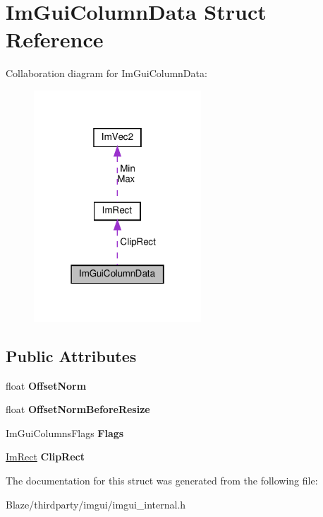 \hypertarget{structImGuiColumnData}{}\section{Im\+Gui\+Column\+Data Struct Reference}
\label{structImGuiColumnData}


Collaboration diagram for Im\+Gui\+Column\+Data\+:\nopagebreak
\begin{figure}[H]
\begin{center}
\leavevmode
\includegraphics[width=178pt]{structImGuiColumnData__coll__graph}
\end{center}
\end{figure}
\subsection*{Public Attributes}
\begin{DoxyCompactItemize}
\item 
\mbox{\label{structImGuiColumnData_a9678a00f55c9fa44ed35ec14ea9b697b}} 
float {\bfseries Offset\+Norm}
\item 
\mbox{\label{structImGuiColumnData_aa97d00380db4a4b11ebc1f1f8ef72fc8}} 
float {\bfseries Offset\+Norm\+Before\+Resize}
\item 
\mbox{\label{structImGuiColumnData_ab683ea097b8c60f143dc3c31818fa8d8}} 
Im\+Gui\+Columns\+Flags {\bfseries Flags}
\item 
\mbox{\label{structImGuiColumnData_aeccf8bbbd380fdd9d3350b5aac95ad34}} 
\hyperlink{structImRect}{Im\+Rect} {\bfseries Clip\+Rect}
\end{DoxyCompactItemize}


The documentation for this struct was generated from the following file\+:\begin{DoxyCompactItemize}
\item 
Blaze/thirdparty/imgui/imgui\+\_\+internal.\+h\end{DoxyCompactItemize}
